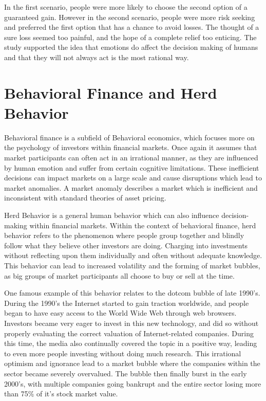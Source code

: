 In the first scenario, people were more likely to choose the second option of a guaranteed gain. However in the second scenario, people were more risk seeking and preferred the first option that has a chance to avoid losses. The thought of a sure loss seemed too painful, and the hope of a complete relief too enticing. The study supported the idea that emotions do affect the decision making of humans and that they will not always act is the most rational way.\autocite{Kahneman2011} \bigbreak

\section{Behavioral Finance and Herd Behavior} \bigbreak

Behavioral finance is a subfield of Behavioral economics, which focuses more on the psychology of investors within financial markets.  Once again it assumes that market participants can often act in an irrational manner, as they are influenced by human emotion and suffer from certain cognitive limitations. These inefficient decisions can impact markets on a large scale and cause disruptions which lead to market anomalies. A market anomaly describes a market which is inefficient and inconsistent with standard theories of asset pricing. \autocite{Kapoor2017} \bigbreak

Herd Behavior is a general human behavior which can also influence decision-making within financial markets. Within the context of behavioral finance, herd behavior refers to the phenomenon where people group together and blindly follow what they believe other investors are doing.  Charging into investments without reflecting upon them individually and often without adequate knowledge.  This behavior can lead to increased volatility and the forming of market bubbles, as big groups of market participants all choose to buy or sell at the time.\autocite{Bikchandani2000} \bigbreak 

One famous example of this behavior relates to the dotcom bubble of late 1990’s. During the 1990’s the Internet started to gain traction worldwide, and people began to have easy access to the World Wide Web through web browsers. Investors became very eager to invest in this new technology, and did so without properly evaluating the correct valuation of Internet-related companies.\autocite{Morris2008} During this time, the media also continually covered the topic in a positive way, leading to even more people investing without doing much research. This irrational optimism and ignorance lead to a market bubble where the companies within the sector became severely overvalued.\autocite{Sanjana2018} The bubble then finally burst in the early 2000’s, with multiple companies going bankrupt and the entire sector losing more than 75\% of it’s stock market value. \autocite{CFI2023} \bigbreak

